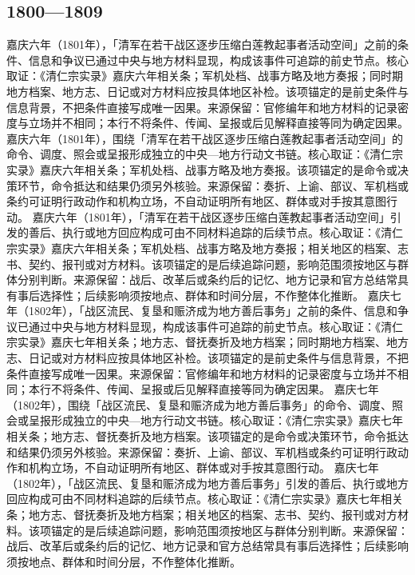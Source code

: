 \subsection{1800—1809}
嘉庆六年（1801年），「清军在若干战区逐步压缩白莲教起事者活动空间」之前的条件、信息和争议已通过中央与地方材料显现，构成该事件可追踪的前史节点。核心取证：《清仁宗实录》嘉庆六年相关条；军机处档、战事方略及地方奏报；同时期地方档案、地方志、日记或对方材料应按具体地区补检。该项锚定的是前史条件与信息背景，不把条件直接写成唯一因果。来源保留：官修编年和地方材料的记录密度与立场并不相同；本行不将条件、传闻、呈报或后见解释直接等同为确定因果。
嘉庆六年（1801年），围绕「清军在若干战区逐步压缩白莲教起事者活动空间」的命令、调度、照会或呈报形成独立的中央—地方行动文书链。核心取证：《清仁宗实录》嘉庆六年相关条；军机处档、战事方略及地方奏报。该项锚定的是命令或决策环节，命令抵达和结果仍须另外核验。来源保留：奏折、上谕、部议、军机档或条约可证明行政动作和机构立场，不自动证明所有地区、群体或对手按其意图行动。
嘉庆六年（1801年），「清军在若干战区逐步压缩白莲教起事者活动空间」引发的善后、执行或地方回应构成可由不同材料追踪的后续节点。核心取证：《清仁宗实录》嘉庆六年相关条；军机处档、战事方略及地方奏报；相关地区的档案、志书、契约、报刊或对方材料。该项锚定的是后续追踪问题，影响范围须按地区与群体分别判断。来源保留：战后、改革后或条约后的记忆、地方记录和官方总结常具有事后选择性；后续影响须按地点、群体和时间分层，不作整体化推断。
嘉庆七年（1802年），「战区流民、复垦和赈济成为地方善后事务」之前的条件、信息和争议已通过中央与地方材料显现，构成该事件可追踪的前史节点。核心取证：《清仁宗实录》嘉庆七年相关条；地方志、督抚奏折及地方档案；同时期地方档案、地方志、日记或对方材料应按具体地区补检。该项锚定的是前史条件与信息背景，不把条件直接写成唯一因果。来源保留：官修编年和地方材料的记录密度与立场并不相同；本行不将条件、传闻、呈报或后见解释直接等同为确定因果。
嘉庆七年（1802年），围绕「战区流民、复垦和赈济成为地方善后事务」的命令、调度、照会或呈报形成独立的中央—地方行动文书链。核心取证：《清仁宗实录》嘉庆七年相关条；地方志、督抚奏折及地方档案。该项锚定的是命令或决策环节，命令抵达和结果仍须另外核验。来源保留：奏折、上谕、部议、军机档或条约可证明行政动作和机构立场，不自动证明所有地区、群体或对手按其意图行动。
嘉庆七年（1802年），「战区流民、复垦和赈济成为地方善后事务」引发的善后、执行或地方回应构成可由不同材料追踪的后续节点。核心取证：《清仁宗实录》嘉庆七年相关条；地方志、督抚奏折及地方档案；相关地区的档案、志书、契约、报刊或对方材料。该项锚定的是后续追踪问题，影响范围须按地区与群体分别判断。来源保留：战后、改革后或条约后的记忆、地方记录和官方总结常具有事后选择性；后续影响须按地点、群体和时间分层，不作整体化推断。
